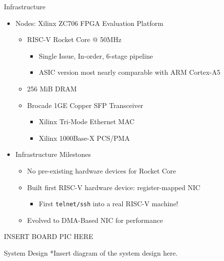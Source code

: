 \begin{block}{Infrastructure}
    \begin{itemize}
        \item Nodes: Xilinx ZC706 FPGA Evaluation Platform
            \begin{itemize}
                \item RISC-V Rocket Core @ 50MHz
                    \begin{itemize}
                        \item Single Issue, In-order, 6-stage pipeline
                        \item ASIC version most nearly comparable with ARM Cortex-A5
                    \end{itemize}
                \item 256 MiB DRAM
                \item Brocade 1GE Copper SFP Transceiver
                    \begin{itemize}
                        \item Xilinx Tri-Mode Ethernet MAC
                        \item Xilinx 1000Base-X PCS/PMA
                    \end{itemize}

            \end{itemize} 
        \item Infrastructure Milestones
            \begin{itemize}
                \item No pre-existing hardware devices for Rocket Core
                \item Built first RISC-V hardware device: register-mapped NIC
                    \begin{itemize}
                        \item First \texttt{telnet/ssh} into a real RISC-V machine!
                    \end{itemize}
                \item Evolved to DMA-Based NIC for performance
            \end{itemize}
    \end{itemize}

INSERT BOARD PIC HERE


\end{block}

\vspace{1ex}

\begin{block}{System Design}
*Insert diagram of the system design here.
\end{block}
